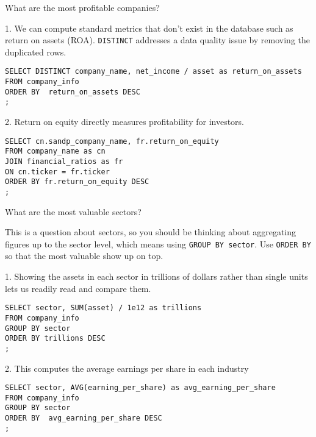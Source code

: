 \documentclass[10pt]{exam}
\begin{document}
\begin{questions}

\question What are the most profitable companies?

\begin{solution}

1. We can compute standard metrics that don't exist in the database such as
return on assets (ROA).
\texttt{DISTINCT} addresses a data quality issue by removing the duplicated
    rows.

\begin{lstlisting}
SELECT DISTINCT company_name, net_income / asset as return_on_assets
FROM company_info
ORDER BY  return_on_assets DESC
;
\end{lstlisting}

2.
Return on equity directly measures profitability for investors.

\begin{lstlisting}
SELECT cn.sandp_company_name, fr.return_on_equity
FROM company_name as cn
JOIN financial_ratios as fr
ON cn.ticker = fr.ticker
ORDER BY fr.return_on_equity DESC
;
\end{lstlisting}

\end{solution}


\question What are the most valuable sectors?

\begin{solution}
    This is a question about sectors, so you should be thinking about
    aggregating figures up to the sector level, which means using \texttt{GROUP
    BY sector}. Use \texttt{ORDER BY} so that the most valuable show up on
    top.

1.    Showing the assets in each sector in trillions of dollars rather than single units lets us
    readily read and compare them.

\begin{lstlisting}
SELECT sector, SUM(asset) / 1e12 as trillions
FROM company_info
GROUP BY sector
ORDER BY trillions DESC
;
\end{lstlisting}

2. This computes the average earnings per share in each industry

\begin{lstlisting}
SELECT sector, AVG(earning_per_share) as avg_earning_per_share
FROM company_info
GROUP BY sector
ORDER BY  avg_earning_per_share DESC
;
\end{lstlisting}
\end{solution}


\end{questions}
\end{document}

